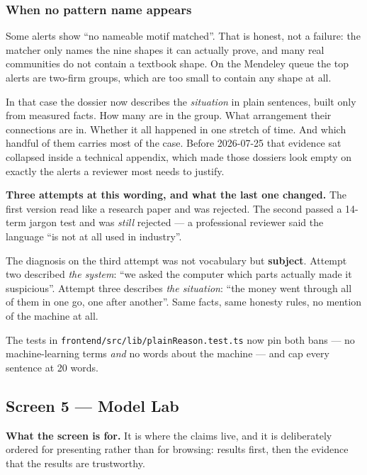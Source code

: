 \documentclass[11pt,a4paper]{article}
\newcommand{\code}[1]{\texttt{\small #1}}
\begin{document}
\subsubsection*{When no pattern name appears}

Some alerts show ``no nameable motif matched''. That is honest, not a failure:
the matcher only names the nine shapes it can actually prove, and many real
communities do not contain a textbook shape. On the Mendeley queue the top
alerts are two-firm groups, which are too small to contain any shape at all.

In that case the dossier now describes the \emph{situation} in plain sentences,
built only from measured facts. How many are in the group. What arrangement
their connections are in. Whether it all happened in one stretch of time. And
which handful of them carries most of the case. Before 2026-07-25 that evidence
sat collapsed inside a technical appendix, which made those dossiers look empty
on exactly the alerts a reviewer most needs to justify.

\begin{warnbox}
\textbf{Three attempts at this wording, and what the last one changed.} The
first version read like a research paper and was rejected. The second passed a
14-term jargon test and was \emph{still} rejected --- a professional reviewer
said the language ``is not at all used in industry''.

The diagnosis on the third attempt was not vocabulary but \textbf{subject}.
Attempt two described \emph{the system}: ``we asked the computer which parts
actually made it suspicious''. Attempt three describes \emph{the situation}:
``the money went through all of them in one go, one after another''. Same
facts, same honesty rules, no mention of the machine at all.

The tests in \code{frontend/src/lib/plainReason.test.ts} now pin both bans ---
no machine-learning terms \emph{and} no words about the machine --- and cap
every sentence at 20 words.
\end{warnbox}

\subsection{Screen 5 --- Model Lab}

\textbf{What the screen is for.} It is where the claims live, and it is
deliberately ordered for presenting rather than for browsing: results first,
then the evidence that the results are trustworthy.
\end{document}
